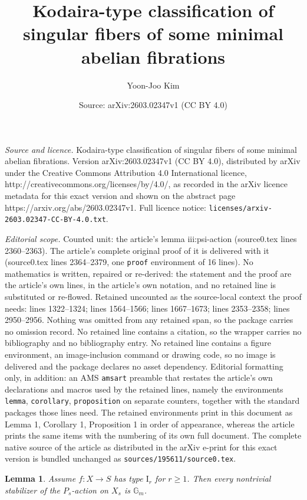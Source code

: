 \documentclass[10pt,a4paper]{amsart}
\title{Kodaira-type classification of singular fibers of some minimal abelian fibrations}
\author{Yoon-Joo Kim}
\date{Source: arXiv:2603.02347v1 (CC BY 4.0)}
\newtheorem{lemma}{Lemma}
\newcommand{\GG}{\mathbb{G}}
\begin{document}
\maketitle

\noindent\emph{Source and licence.} Kodaira-type classification of singular fibers of some minimal abelian fibrations. Version arXiv:2603.02347v1 (CC BY 4.0), distributed by arXiv under the Creative Commons Attribution 4.0 International licence, http://creativecommons.org/licenses/by/4.0/, as recorded in the arXiv licence metadata for this exact version and shown on the abstract page https://arxiv.org/abs/2603.02347v1. Full licence notice: \texttt{licenses/arxiv-2603.02347-CC-BY-4.0.txt}.\par\smallskip

\noindent\textit{Editorial scope.} Counted unit: the article's lemma iii:psi-action (source0.tex lines 2360--2363). The article's complete original proof of it is delivered with it (source0.tex lines 2364--2379, one \texttt{proof} environment of 16 lines). No mathematics is written, repaired or re-derived: the statement and the proof are the article's own lines, in the article's own notation, and no retained line is substituted or re-flowed.  Retained uncounted as the source-local context the proof needs: lines 1322--1324; lines 1564--1566; lines 1667--1673; lines 2353--2358; lines 2950--2956.  Nothing was omitted from any retained span, so the package carries no omission record.  No retained line contains a citation, so the wrapper carries no bibliography and no bibliography entry.  No retained line contains a figure environment, an image-inclusion command or drawing code, so no image is delivered and the package declares no asset dependency.  Editorial formatting only, in addition: an AMS \texttt{amsart} preamble that restates the article's own declarations and macros used by the retained lines, namely the environments \texttt{lemma}, \texttt{corollary}, \texttt{proposition} on separate counters, together with the standard packages those lines need.  The retained environments print in this document as Lemma 1, Corollary 1, Proposition 1 in order of appearance, whereas the article prints the same items with the numbering of its own full document.  The complete native source of the article as distributed in the arXiv e-print for this exact version is bundled unchanged as \texttt{sources/195611/source0.tex}.
		\begin{lemma} \label{lem:stabilizer of Ir}
			Assume $f : X \to S$ has type $\mathrm I_r$ for $r \ge 1$. Then every nontrivial stabilizer of the $P_s$-action on $X_s$ is $\GG_m$.
		\end{lemma}
\end{document}
